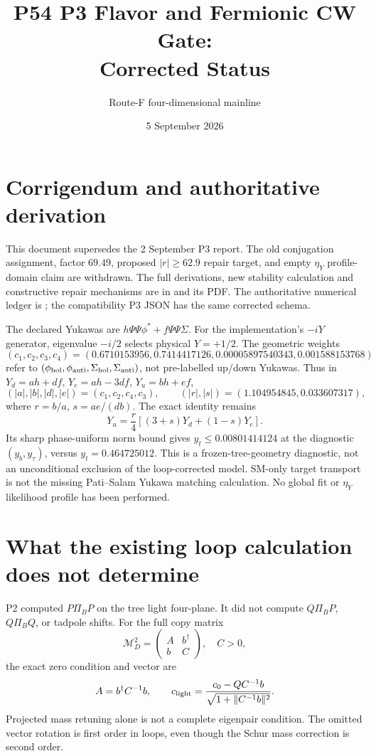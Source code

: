 \documentclass[11pt]{article}
\title{P54 P3 Flavor and Fermionic CW Gate:\\Corrected Status}
\author{Route-F four-dimensional mainline}
\date{5 September 2026}
\begin{document}
\maketitle
\section{Corrigendum and authoritative derivation}
This document supersedes the 2 September P3 report.
The old conjugation assignment, factor $69.49$, proposed $|r|\ge62.9$
repair target, and empty $\eta_Y$ profile-domain claim are withdrawn.
The full derivations, new stability calculation and constructive repair
mechanisms are in
and its PDF. The authoritative numerical ledger is
;
the compatibility P3 JSON has the same corrected schema.

The declared Yukawas are $h\Psi\Psi\phi^*+f\Psi\Psi\Sigma$.
For the implementation's $-iY$ generator, eigenvalue $-i/2$ selects
physical $Y=+1/2$. The geometric weights
\[
(c_1,c_2,c_3,c_4)=
(0.6710153956,0.7414417126,0.00005897540343,0.001588153768)
\]
refer to $(\phi_{\rm hol},\phi_{\rm anti},\Sigma_{\rm hol},
\Sigma_{\rm anti})$, not pre-labelled up/down Yukawas.
Thus in $Y_d=ah+df$, $Y_e=ah-3df$, $Y_u=bh+ef$,
\[
(|a|,|b|,|d|,|e|)=(c_1,c_2,c_4,c_3),\qquad
(|r|,|s|)=(1.104954845,0.033607317),
\]
where $r=b/a$, $s=ae/(db)$. The exact identity remains
\[
Y_u=\frac r4[(3+s)Y_d+(1-s)Y_e].
\]
Its sharp phase-uniform norm bound gives $y_t\le0.00801414124$
at the diagnostic $(y_b,y_\tau)$, versus $y_t=0.464725012$.
This is a frozen-tree-geometry diagnostic, not an unconditional
exclusion of the loop-corrected model. SM-only target transport is not
the missing Pati--Salam Yukawa matching calculation.
No global fit or $\eta_Y$ likelihood profile has been performed.

\section{What the existing loop calculation does not determine}
P2 computed $P\Pi_BP$ on the tree light four-plane.
It did not compute $Q\Pi_BP$, $Q\Pi_BQ$, or tadpole shifts.
For the full copy matrix
\[
\mathcal M_D^2=\begin{pmatrix}A&b^\dagger\\b&C\end{pmatrix},\quad C>0,
\]
the exact zero condition and vector are
\[
A=b^\dagger C^{-1}b,\qquad
c_{\rm light}=\frac{c_0-QC^{-1}b}
{\sqrt{1+\|C^{-1}b\|^2}}.
\]
Projected mass retuning alone is not a complete eigenpair condition.
The omitted vector rotation is first order in loops, even though the
Schur mass correction is second order.
\end{document}
